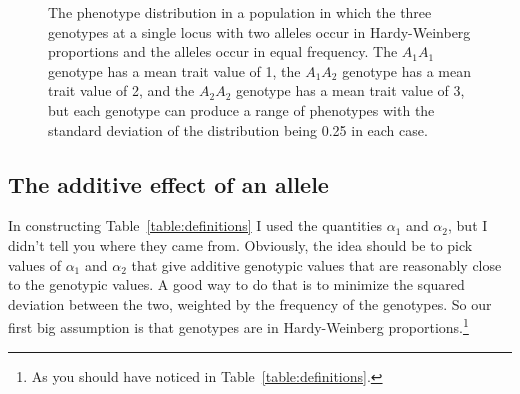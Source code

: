 \begin{figure}
\begin{center}
\end{center}
\caption{The phenotype distribution in a population in which the three
  genotypes at a single locus with two alleles occur in Hardy-Weinberg
  proportions and the alleles occur in equal frequency. The $A_1A_1$
  genotype has a mean trait value of 1, the $A_1A_2$ genotype has a
  mean trait value of 2, and the $A_2A_2$ genotype has a mean trait
  value of 3, but each genotype can produce a range of phenotypes with
  the standard deviation of the distribution being 0.25 in each
  case.}\label{fig:genotypic-value}
\end{figure}

\subsection*{The additive effect of an allele}

In constructing Table~\ref{table:definitions} I used the quantities
$\alpha_1$ and $\alpha_2$, but I didn't tell you where they came
from. Obviously, the idea should be to pick values of $\alpha_1$ and
$\alpha_2$ that give additive genotypic values that are reasonably
close to the genotypic values. A good way to do that is to minimize
the squared deviation between the two, weighted by the frequency of
the genotypes. So our first big assumption is that genotypes are in
Hardy-Weinberg proportions.\footnote{As you should have noticed in
  Table~\ref{table:definitions}.}

